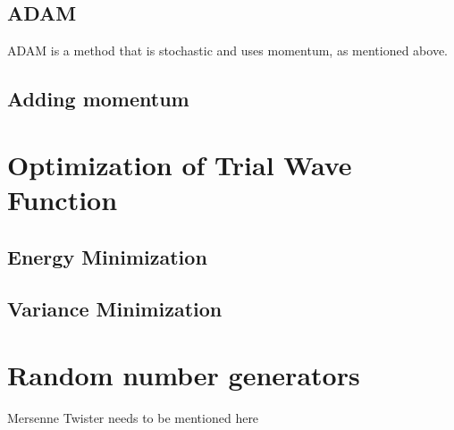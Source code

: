 \subsection{ADAM}
ADAM is a method that is stochastic and uses momentum, as mentioned above. 

\subsection{Adding momentum}

\section{Optimization of Trial Wave Function}
\subsection{Energy Minimization}
\subsection{Variance Minimization}

\section{Random number generators} \label{sec:RNG}
Mersenne Twister needs to be mentioned here